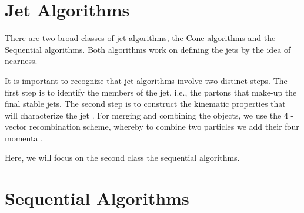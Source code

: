 \section{Jet Algorithms}

There are two broad classes of jet algorithms, the Cone algorithms and the Sequential algorithms. Both algorithms work on defining the jets by the idea of nearness.

It is important to recognize that jet algorithms involve two distinct steps. The first step is to identify the members of the jet, i.e., the partons that make-up the final stable jets. The second step is to construct the kinematic properties that will characterize the jet \citep{Berger:2002jt}. For merging and combining the objects, we use the 4 -vector recombination scheme, whereby to combine two particles we add their four momenta \citep{Blazey:2000qt}. 

Here, we will focus on the second class the sequential algorithms.  

%
%
\section{Sequential Algorithms}

